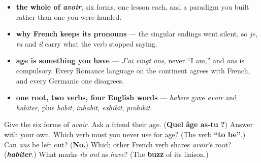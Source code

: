 \begin{grammarlens}[title={What you've built this chapter}]
\begin{itemize}
\raggedright
  \item \textbf{the whole of \emph{avoir}}, six forms, one lesson each, and a paradigm you built rather than one you were handed.
  \item \textbf{why French keeps its pronouns} — the singular endings went silent, so \emph{je}, \emph{tu} and \emph{il} carry what the verb stopped saying.
  \item \textbf{age is something you have} — \emph{J'ai vingt ans}, never \textquotedblleft{}I am,\textquotedblright{} and \emph{ans} is compulsory. Every Romance language on the continent agrees with French, and every Germanic one disagrees.
  \item \textbf{one root, two verbs, four English words} — \emph{habēre} gave \emph{avoir} and \emph{habiter}, plus \emph{habit}, \emph{inhabit}, \emph{exhibit}, \emph{prohibit}.
\end{itemize}
\end{grammarlens}

\begin{tcolorbox}[breakable,colback=teal!4,colframe=teal!35!black,title={Before you move on}]
Give the six forms of \emph{avoir}. Ask a friend their age. (\textbf{Quel âge as-tu ?}) Answer with your own. Which verb must you never use for age? (The verb \textbf{\textquotedblleft{}to be\textquotedblright{}}.) Can \emph{ans} be left out? (\textbf{No.}) Which other French verb shares \emph{avoir}'s root? (\emph{\textbf{habiter}}.) What marks \emph{ils ont} as \emph{have}? (The \textbf{buzz} of its liaison.)
\end{tcolorbox}
